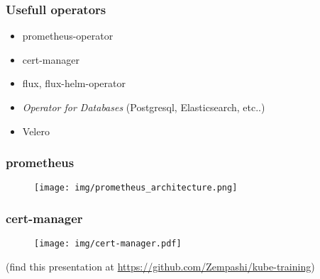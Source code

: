 \documentclass{beamer}
\begin{document}
\begin{frame}
  \frametitle{Usefull operators}
  \begin{itemize}
    \item prometheus-operator
    \item cert-manager
    \item flux, flux-helm-operator
    \item {\it Operator for Databases} (Postgresql, Elasticsearch, etc..)
    \item Velero
  \end{itemize}
\end{frame}

\begin{frame}
  \frametitle{prometheus}
  \begin{figure}
    \begin{center}
      \texttt{[image: img/prometheus\_architecture.png]}
    \end{center}
  \end{figure}
\end{frame}

\begin{frame}
  \frametitle{cert-manager}
  \begin{figure}
    \begin{center}
      \texttt{[image: img/cert-manager.pdf]}
    \end{center}
  \end{figure}
\end{frame}

\begin{frame}
\vfill
{}
\vfill
(find this presentation at \href{https://github.com/Zempashi/kube-training}{https://github.com/Zempashi/kube-training})
\end{frame}
\end{document}
